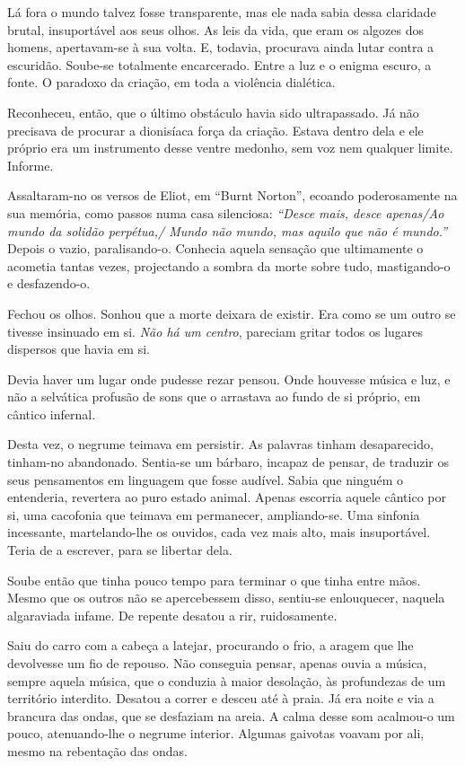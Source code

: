 Lá fora o mundo talvez fosse transparente, mas ele nada sabia dessa
claridade brutal, insuportável aos seus olhos. As leis da vida, que eram
os algozes dos homens, apertavam-se à sua volta. E, todavia, procurava
ainda lutar contra a escuridão. Soube-se totalmente encarcerado. Entre a
luz e o enigma escuro, a fonte. O paradoxo da criação, em toda a
violência dialética.

Reconheceu, então, que o último obstáculo havia sido ultrapassado. Já
não precisava de procurar a dionisíaca força da criação. Estava dentro
dela e ele próprio era um instrumento desse ventre medonho, sem voz nem
qualquer limite. Informe.

Assaltaram-no os versos de Eliot, em ``Burnt Norton'', ecoando
poderosamente na sua memória, como passos numa casa silenciosa:\emph{
``Desce mais, desce apenas/Ao mundo da solidão perpétua,/ Mundo não
mundo, mas aquilo que não é mundo.''} Depois o vazio, paralisando-o.
Conhecia aquela sensação que ultimamente o acometia tantas vezes,
projectando a sombra da morte sobre tudo, mastigando-o e desfazendo-o.

Fechou os olhos. Sonhou que a morte deixara de existir. Era como se um
outro se tivesse insinuado em si. \emph{Não há um centro}, pareciam gritar
todos os lugares dispersos que havia em si.

Devia haver um lugar onde pudesse rezar pensou. Onde houvesse música e
luz, e não a selvática profusão de sons que o arrastava ao fundo de si
próprio, em cântico infernal.

Desta vez, o negrume teimava em persistir. As palavras tinham
desaparecido, tinham-no abandonado. Sentia-se um bárbaro, incapaz de
pensar, de traduzir os seus pensamentos em linguagem que fosse audível.
Sabia que ninguém o entenderia, revertera ao puro estado animal. Apenas
escorria aquele cântico por si, uma cacofonia que teimava em permanecer,
ampliando-se. Uma sinfonia incessante, martelando-lhe os ouvidos, cada
vez mais alto, mais insuportável. Teria de a escrever, para se libertar
dela.

Soube então que tinha pouco tempo para terminar o que tinha entre mãos.
Mesmo que os outros não se apercebessem disso, sentiu-se enlouquecer,
naquela algaraviada infame. De repente desatou a rir, ruidosamente.

Saiu do carro com a cabeça a latejar, procurando o frio, a aragem que
lhe devolvesse um fio de repouso. Não conseguia pensar, apenas ouvia a
música, sempre aquela música, que o conduzia à maior desolação, às
profundezas de um território interdito. Desatou a correr e desceu até à
praia. Já era noite e via a brancura das ondas, que se desfaziam na
areia. A calma desse som acalmou-o um pouco, atenuando-lhe o negrume
interior. Algumas gaivotas voavam por ali, mesmo na rebentação das
ondas.

